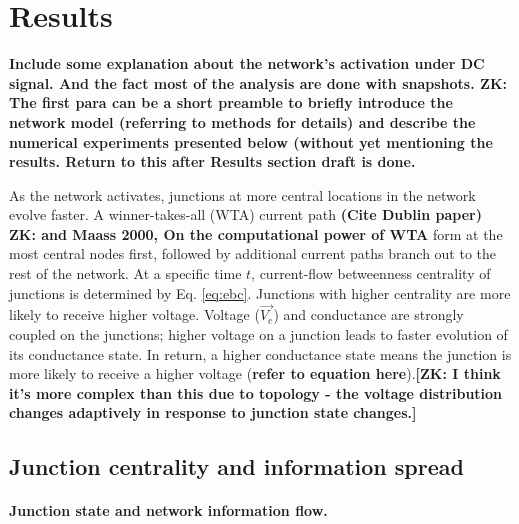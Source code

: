 \documentclass[fleqn,10pt,  reprint, amsmath,amssymb,aps, floatfix]{wlscirep}
\begin{document}
\clearpage
\section*{Results}

\textbf{Include some explanation about the network's activation under DC signal. And the fact most of the analysis are done with snapshots. ZK: The first para can be a short preamble to briefly introduce the network model (referring to methods for details) and describe the numerical experiments presented below (without yet mentioning the results. Return to this after Results section draft is done.}


As the network activates, junctions at more central locations in the network evolve faster. A winner-takes-all (WTA) current path \textbf{(Cite Dublin paper) ZK: and Maass 2000, On the computational power of WTA} form at the most central nodes first, followed by additional current paths branch out to the rest of the network. At a specific time $t$, current-flow betweenness centrality of junctions is determined by Eq. \ref{eq:ebc}. Junctions with higher centrality are more likely to receive higher voltage. Voltage ($\vec{V_e}$) and conductance are strongly coupled on the junctions; higher voltage on a junction leads to faster evolution of its conductance state.
In return, a higher conductance state means the junction is more likely to receive a higher voltage (\textbf{refer to equation here}).\textbf{[ZK: I think it's more complex than this due to topology - the voltage distribution changes adaptively in response to junction state changes.]}


\subsection*{Junction centrality and information spread}

\paragraph{Junction state and network information flow.}
\end{document}
